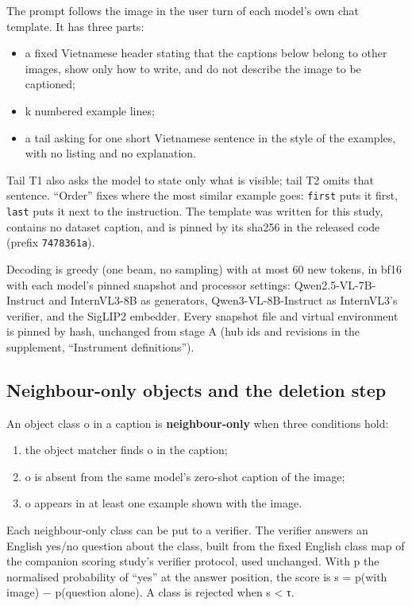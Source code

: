 \documentclass[manuscript,screen]{acmart}
\providecommand{\tightlist}{\setlength{\itemsep}{0pt}\setlength{\parskip}{0pt}}
\begin{document}
The prompt follows the image in the user turn of each model's own chat template. It has three parts:

\begin{itemize}
\tightlist
\item
  a fixed Vietnamese header stating that the captions below belong to other images, show only how to
  write, and do not describe the image to be captioned;
\item
  k numbered example lines;
\item
  a tail asking for one short Vietnamese sentence in the style of the examples, with no listing and
  no explanation.
\end{itemize}

Tail T1 also asks the model to state only what is visible; tail T2 omits that sentence. ``Order''
fixes where the most similar example goes: \texttt{first} puts it first, \texttt{last} puts it next
to the instruction. The template was written for this study, contains no dataset caption, and is
pinned by its sha256 in the released code (prefix \texttt{7478361a}).

Decoding is greedy (one beam, no sampling) with at most 60 new tokens, in bf16 with each model's
pinned snapshot and processor settings: Qwen2.5-VL-7B-Instruct and InternVL3-8B as generators,
Qwen3-VL-8B-Instruct as InternVL3's verifier, and the SigLIP2 embedder. Every snapshot file and
virtual environment is pinned by hash, unchanged from stage A (hub ids and revisions in the
supplement, ``Instrument definitions'').

\subsection{Neighbour-only objects and the deletion
step}\label{neighbour-only-objects-and-the-deletion-step}

An object class o in a caption is \textbf{neighbour-only} when three conditions hold:

\begin{enumerate}
\def\labelenumi{\arabic{enumi}.}
\tightlist
\item
  the object matcher finds o in the caption;
\item
  o is absent from the same model's zero-shot caption of the image;
\item
  o appears in at least one example shown with the image.
\end{enumerate}

Each neighbour-only class can be put to a verifier. The verifier answers an English yes/no question
about the class, built from the fixed English class map of the companion scoring study's verifier
protocol, used unchanged. With p the normalised probability of ``yes'' at the answer position, the
score is s = p(with image) − p(question alone). A class is rejected when s \textless{} τ.
\end{document}
